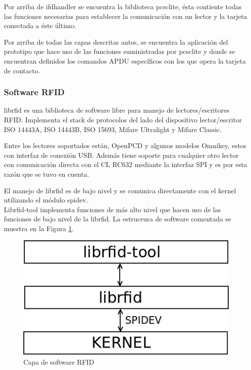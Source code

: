 \documentclass[%
        final,
        notitlepage,
        narroweqnarray,
        inline,
        ]{ieee}
\begin{document}
Por arriba de ifdhandler se encuentra la biblioteca pcsclite, ésta contiente todas las funciones necesarias para establecer la comunicación con un lector y la tarjeta conectada a éste último.

\bigskip
{}
Por arriba de todas las capas descritas antes, se encuentra la aplicación del prototipo que hace uso de las funciones suministradas por pcsclite y donde se encuentran definidos los comandos APDU específicos con los que opera la tarjeta de contacto.

\bigskip
\subsubsection*{Software RFID}

librfid \cite{librfid} es una biblioteca de software libre para manejo de lectores/escritores RFID. Implementa el stack de protocolos del lado del dispositivo lector/escritor ISO 14443A, ISO 14443B, ISO 15693, Mifare Ultralight y Mifare Classic.

Entre los lectores soportados están, OpenPCD y algunos modelos Omnikey, estos con interfaz de conexión USB. Además tiene soporte para cualquier otro lector con comunicación directa con el CL RC632 mediante la interfaz SPI y es por esta razón que se tuvo en cuenta.

El manejo de librfid es de bajo nivel y se comunica directamente con el kernel utilizando el módulo spidev. \\
Librfid-tool implementa funciones de más alto nivel que hacen uso de las funciones de bajo nivel de la librfid. La estrucrura de software comentada se muestra en la Figura \ref{sw_RFID}.

\begin{figure}[b]
\centering
  \begin{center}
  \includegraphics[scale=.4]{../docs/Imagenes/librfid-tool.jpg} 
  \end{center}
  \caption{Capa de software RFID}\label{sw_RFID} 
\end{figure}
\end{document}
